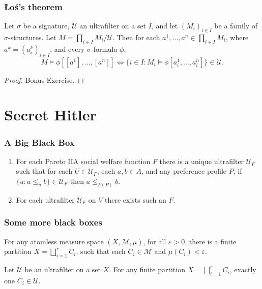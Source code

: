 \documentclass{beamer}
\theoremstyle{definition}
\begin{document}
\begin{frame}
    \frametitle{Łoś's theorem}

    \pause
    \begin{theorem}
        Let $\sigma$ be a signature, $\mathcal{U}$ an ultrafilter on a set $I$, and let $(M_i)_{i \in I}$ be a family of $\sigma$-structures.
        Let $M = \prod_{i \in I} M_i / \mathcal{U}$. Then for each $a^1, \dots, a^n \in \prod_{i \in I} M_i$, where $a^k = (a^k_i)_{i \in I}$,
        and every $\sigma$-formula $\phi$,
        \pause
        \[
            M \models \phi[[a^1], \dots, [a^n]] \iff \{i \in I : M_i \models \phi[a_i^1, \dots, a_i^n]\} \in \mathcal{U}.
        \]
    \end{theorem}
    \pause
    \begin{proof}
        \pause
        Bonus Exercise.
    \end{proof}

\end{frame}

\section{Secret Hitler}

\begin{frame}
    \frametitle{A Big Black Box}

    \begin{theorem}
        \begin{enumerate}
            \item For each Pareto IIA social welfare function $F$ there is a unique ultrafilter $\mathcal{U}_F$ such that for each $U \in \mathcal{U}_F$,
            each $a, b \in A$, and any preference profile $P$, if $\{u : a \leq_{u} b\} \in \mathcal{U}_F$ then $a \leq_{F(P)} b$.
            \item For each ultrafilter $\mathcal{U}_F$ on $V$ there exists such an $F$.
        \end{enumerate}
    \end{theorem}

\end{frame}

\begin{frame}
    \frametitle{Some more black boxes}
    
    \begin{fact}[Fact 1]
        For any atomless measure space $(X, \mathcal{M}, \mu)$, for all $\varepsilon > 0$, there is a finite partition $X = \bigsqcup_{i=1}^r C_i$,
        such that each $C_i \in \mathcal{M}$  and $\mu(C_i) < \varepsilon$.
    \end{fact}

    \begin{fact}[Fact 2]
        Let $\mathcal{U}$ be an ultrafilter on a set $X$. For any finite partition $X = \bigsqcup_{i=1}^r C_i$, exactly one $C_i \in \mathcal{U}$.
    \end{fact}

\end{frame}
\end{document}
